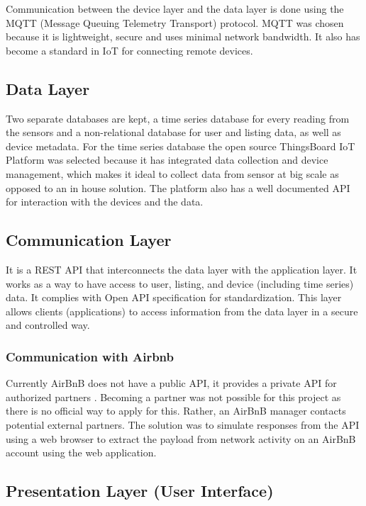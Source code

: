 Communication between the device layer and the data layer is done using the MQTT (Message Queuing Telemetry Transport) 
\cite{MQTT2024} protocol. MQTT was chosen because it is lightweight, secure and uses minimal network bandwidth. It also 
has become a standard in IoT for connecting remote devices.

\subsection{Data Layer}

Two separate databases are kept, a time series database for every reading from the sensors and a non-relational database 
for user and listing data, as well as device metadata. For the time series database the open source ThingsBoard IoT 
Platform \cite{ThingsBoard2024}was selected because it has integrated data collection and device management, which makes 
it ideal to collect data from sensor at big scale as opposed to an in house solution. The platform also has a well 
documented API for interaction with the devices and the data. 

\subsection{Communication Layer}

It is a REST API that interconnects the data layer with the application layer. It works as a way to have access to user, 
listing, and device (including time series) data. It complies with Open API \cite{OpenAPI2024} specification for 
standardization. This layer allows clients (applications) to access information from the data layer in a secure and 
controlled way.

\subsubsection{Communication with Airbnb}

Currently AirBnB does not have a public API, it provides a private API for authorized partners \cite{Airbnb2024c}. 
Becoming a partner was not possible for this project as there is no official way to apply for this. Rather, an AirBnB
manager contacts potential external partners. The solution was to simulate responses from the API using a web browser
to extract the payload from network activity on an AirBnB account using the web application.

\subsection{Presentation Layer (User Interface)}

